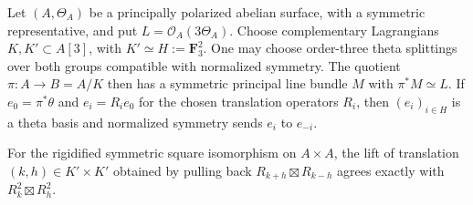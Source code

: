 \begin{lemma}
\label{lem:ppav-symmetric-level3-addition-gauge}
Let \((A,\Theta_A)\) be a principally polarized abelian surface,
with a symmetric representative, and put \(L=\mathcal O_A(3\Theta_A)\).
Choose complementary Lagrangians \(K,K'\subset A[3]\), with
\(K'\simeq H:=\mathbf F_3^2\).  One may choose order-three theta
splittings over both groups compatible with normalized symmetry.
The quotient \(\pi:A\to B=A/K\) then has a symmetric principal
line bundle \(M\) with \(\pi^*M\simeq L\).  If
\(e_0=\pi^*\theta\) and \(e_i=R_i e_0\) for the chosen
translation operators \(R_i\), then \((e_i)_{i\in H}\) is a theta
basis and normalized symmetry sends \(e_i\) to \(e_{-i}\).

For the rigidified symmetric square isomorphism on \(A\times A\),
the lift of translation \((k,h)\in K'\times K'\) obtained by
pulling back \(R_{k+h}\boxtimes R_{k-h}\) agrees exactly with
\(R_k^2\boxtimes R_h^2\).
\end{lemma}
